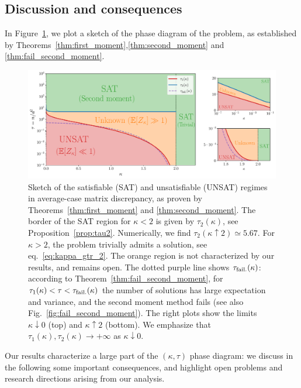 \subsection{Discussion and consequences}\label{subsec:discussion}

In Figure~\ref{fig:phase_diagram}, we plot a sketch of the phase diagram of the problem, as established by Theorems~\ref{thm:first_moment},\ref{thm:second_moment} and \ref{thm:fail_second_moment}. 
\begin{figure}[!t]
    \centering
    \includegraphics[width=1.0\textwidth]{figures/phase_diagram.pdf}
    \caption{
        Sketch of the satisfiable (SAT) and unsatisfiable (UNSAT) regimes in average-case matrix discrepancy, 
        as proven by Theorems~\ref{thm:first_moment} and \ref{thm:second_moment}. 
        The border of the SAT region for $\kappa < 2$ is given by $\tau_2(\kappa)$, see Proposition~\ref{prop:tau2}. 
        Numerically, we find $\tau_2(\kappa \uparrow 2) \simeq 5.67$.
        For $\kappa >2$, the problem trivially admits a solution, see eq.~\eqref{eq:kappa_gtr_2}.
        The orange region is not characterized by our results, and remains open.
        The dotted purple line shows $\tau_{\rm fail.}(\kappa)$: according to Theorem~\ref{thm:fail_second_moment}, for $\tau_1(\kappa) < \tau < \tau_{\rm fail.}(\kappa)$ the number of solutions 
        has large expectation and variance, and the second moment method fails (see also Fig.~\ref{fig:fail_second_moment}).
        The right plots show the limits $\kappa \downarrow 0$ (top) and $\kappa \uparrow 2$ (bottom).
        We emphasize that $\tau_1(\kappa), \tau_2(\kappa) \to +\infty$ as $\kappa \downarrow 0$.
    \label{fig:phase_diagram}}
\end{figure}
Our results characterize a large part of the $(\kappa, \tau)$ phase diagram: 
we discuss in the following some important consequences, 
and highlight open problems and research directions arising from our analysis.

